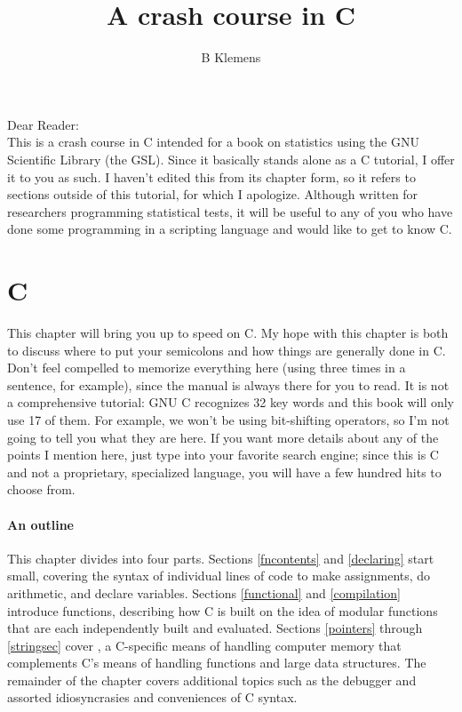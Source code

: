 \documentclass[12pt]{article}
\begin{document}
	\title{A crash course in C}
	\author{B Klemens}
	\maketitle


Dear Reader:\\
This is a crash course in C intended for a book on statistics using the
GNU Scientific Library (the GSL).  Since it basically stands alone as a
C tutorial, I offer it to you as such. I haven't edited this from
its chapter form, so it refers to sections outside of this tutorial,
for which I apologize. Although written for researchers programming
statistical tests, it will be useful to any of you who have done some
programming in a scripting language and would like to get to know C.

\vskip 1cm

\section{C}
\fi



This chapter will bring you up to speed on C.  
My hope with this chapter is both to discuss where to put your semicolons
and how things are generally done in C. Don't feel compelled to memorize
everything here (using  three times in a sentence, for
example), since the manual is always there for you to read.  It is not
a comprehensive tutorial: GNU C recognizes 32 key words and this book
will only use 17 of them. For example, we won't be using bit-shifting
operators, so I'm not going to tell you what they are here.  If you want
more details about any of the points I mention here, just type  into your favorite search engine; since this is C and not a
proprietary, specialized language, you will have a few hundred hits to
choose from. 

\paragraph{An outline} 

This chapter divides into four parts.
Sections \ref{fncontents} and  \ref{declaring} start small, covering the syntax of individual lines of code to make assignments, do arithmetic, and declare variables.
Sections \ref{functional} and \ref{compilation} introduce functions,
describing how C is built on the idea of modular functions that are
each independently built and evaluated.  Sections \ref{pointers}
through \ref{stringsec} cover
, a C-specific means of handling computer memory that
complements C's means of handling functions and large data structures. The
remainder of the chapter covers additional topics such as the debugger
and assorted idiosyncrasies and conveniences of C syntax.
\end{document}
